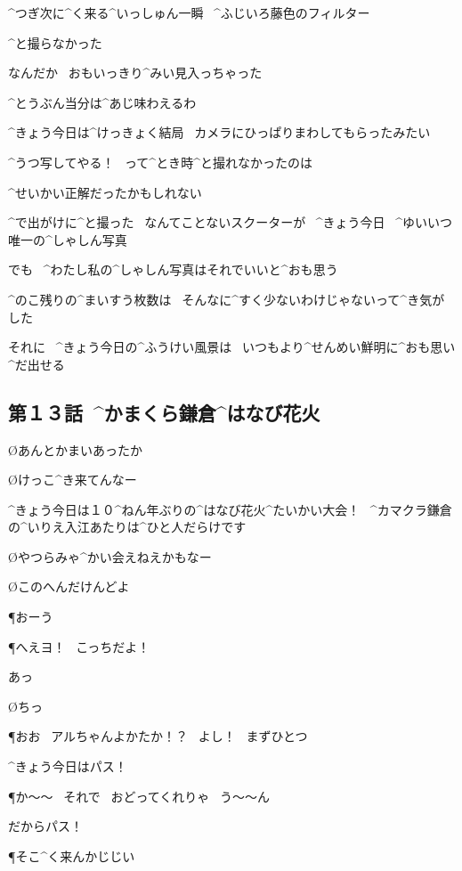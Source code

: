 \A ^{つぎ}{次}に^{く}{来}る^{いっしゅん}{一瞬}
\ ^{ふじいろ}{藤色}のフィルター

\page[80]
\A ^{と}{撮}らなかった

\A なんだか
\ おもいっきり^{みい}{見入}っちゃった

\A ^{とうぶん}{当分}は^{あじ}{味}わえるわ

\page
\A ^{きょう}{今日}は^{けっきょく}{結局}
\ カメラにひっぱりまわしてもらったみたい

\A ^{うつ}{写}してやる！
\ って^{とき}{時}^{と}{撮}れなかったのは

\A ^{せいかい}{正解}だったかもしれない

\page
\A ^{で}{出}がけに^{と}{撮}った
\ なんてことないスクーターが
\ ^{きょう}{今日}
\ ^{ゆいいつ}{唯一}の^{しゃしん}{写真}

\A でも
\ ^{わたし}{私}の^{しゃしん}{写真}はそれでいいと^{おも}{思}う

\A ^{のこ}{残}りの^{まいすう}{枚数}は
\ そんなに^{すく}{少}ないわけじゃないって^{き}{気}がした

\A それに
\ ^{きょう}{今日}の^{ふうけい}{風景}は
\ いつもより^{せんめい}{鮮明}に^{おも}{思}い^{だ}{出}せる



\subsection{第１３話\ ^{かまくら}{鎌倉}^{はなび}{花火}}

\page[84]
\O あんとかまいあったか

\O けっこ^{き}{来}てんなー

\page
\A ^{きょう}{今日}は１０^{ねん}{年}ぶりの^{はなび}{花火}^{たいかい}{大会}！
\ ^{カマクラ}{鎌倉}の^{いりえ}{入江}あたりは^{ひと}{人}だらけです

\O やつらみゃ^{かい}{会}えねえかもなー

\O このへんだけんどよ

\P おーう

\page
\P へえヨ！
\ こっちだよ！

\A あっ

\O ちっ

\P おお
\ アルちゃんよかたか！？
\ よし！
\ まずひとつ

\A ^{きょう}{今日}はパス！

\P か〜〜
\ それで
\ おどってくれりゃ
\ う〜〜ん

\A だからパス！

\page
\P そこ^{く}{来}んかじじい

